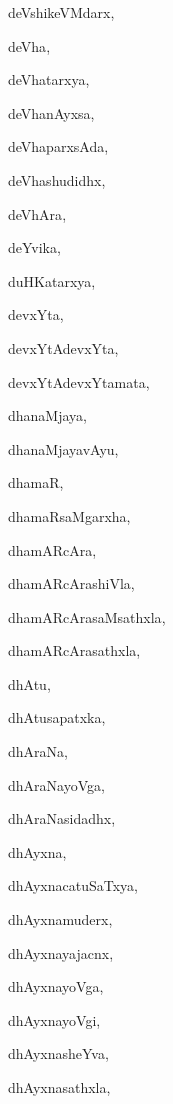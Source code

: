 \begin{multicols}{2}
{deVshikeVMdarx}, \pageref{deVshikeVMdarx}

{deVha}, \pageref{deVha}

{deVhatarxya}, \pageref{deVhatarxya}

{deVhanAyxsa}, \pageref{deVhanAyxsa}

{deVhaparxsAda}, \pageref{deVhaparxsAda}

{deVhashudidhx}, \pageref{deVhashudidhx}

{deVhAra}, \pageref{deVhAra}

{deYvika}, \pageref{deYvika}

{duHKatarxya}, \pageref{duHKatarxya}

{devxYta}, \pageref{devxYta}

{devxYtAdevxYta}, \pageref{devxYtAdevxYta}

{devxYtAdevxYtamata}, \pageref{devxYtAdevxYtamata}

{dhanaMjaya}, \pageref{dhanaMjaya}

{dhanaMjayavAyu}, \pageref{dhanaMjayavAyu}

{dhamaR}, \pageref{dhamaR}

{dhamaRsaMgarxha}, \pageref{dhamaRsaMgarxha}

{dhamARcAra}, \pageref{dhamARcAra}

{dhamARcArashiVla}, \pageref{dhamARcArashiVla}

{dhamARcArasaMsathxla}, \pageref{dhamARcArasaMsathxla}

{dhamARcArasathxla}, \pageref{dhamARcArasathxla}

{dhAtu}, \pageref{dhAtu}

{dhAtusapatxka}, \pageref{dhAtusapatxka}

{dhAraNa}, \pageref{dhAraNa}

{dhAraNayoVga}, \pageref{dhAraNayoVga}

{dhAraNasidadhx}, \pageref{dhAraNasidadhx}

{dhAyxna}, \pageref{dhAyxna}

{dhAyxnacatuSaTxya}, \pageref{dhAyxnacatuSaTxya}

{dhAyxnamuderx}, \pageref{dhAyxnamuderx}

{dhAyxnayajacnx}, \pageref{dhAyxnayajacnx}

{dhAyxnayoVga}, \pageref{dhAyxnayoVga}

{dhAyxnayoVgi}, \pageref{dhAyxnayoVgi}

{dhAyxnasheYva}, \pageref{dhAyxnasheYva}

{dhAyxnasathxla}, \pageref{dhAyxnasathxla}


\end{multicols}
